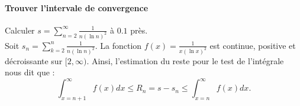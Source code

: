\documentclass{report}
\begin{document}
\begin{multicols*}{2}
      \paragraph{Trouver l'intervale de convergence}
      Calculer $s = \sum_{n=2}^{\infty } \frac{1}{n (\ln n)^2}$ à 
      $0.1$ près. 
      \vspace{1em}\\
      Soit $s_n=\sum_{k=2}^n \frac{1}{n(\ln n)^2}$. 
      La fonction $f(x)=\frac{1}{x(\ln x)^2}$ est continue, positive et décroissante 
      sur $[2, \infty)$. Ainsi, l'estimation du reste pour le test de l'intégrale 
      nous dit que :
      $$
      \int_{x=n+1}^{\infty } f(x) d x \leq R_n=s-s_n \leq \int_{x=n}^{\infty} f(x) d x .
      $$
      $$
      $$%



  








 









\end{multicols*}
\end{document}
